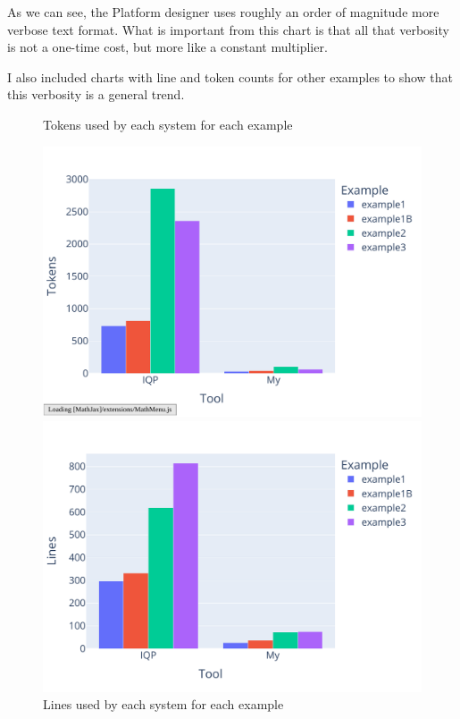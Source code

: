 \documentclass[12pt]{report}
\begin{document}
As we can see, the Platform designer uses roughly an order of magnitude more verbose text format. What is important from this chart is that all that verbosity is not a one-time cost, but more like a constant multiplier.  
\par 
I also included charts with line and token counts for other examples to show that this verbosity is a general trend. 
\begin{figure}[H] 
\begin{minipage}{.45\textwidth} 
   \caption{Tokens used by each system for each example} 
   \includegraphics[width=\textwidth]{charts/all_tokens.pdf} 
   \centering 
\end{minipage}%
\hspace{0.5cm} 
\begin{minipage}{.45\textwidth} 
   \caption{Lines used by each system for each example} 
   \includegraphics[width=\textwidth]{charts/all_lines.pdf} 
   \centering 
\end{minipage} 
\end{figure} 
\end{document}
